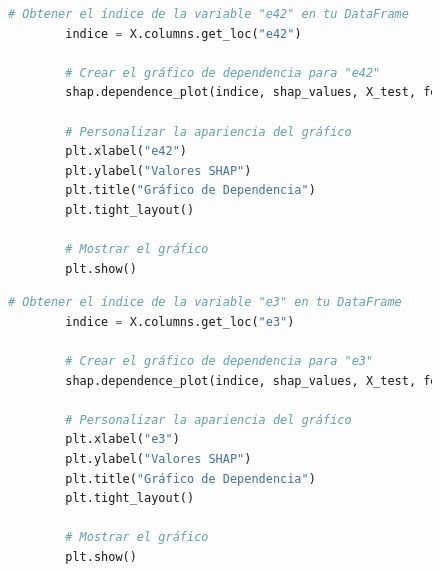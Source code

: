 \begin{figure}[H]
    \centering
    \begin{minipage}{0.48\textwidth}
        \begin{lstlisting}[language=Python, caption=Grafico de dependencia e42, label=lst:grafDepe42]
        # Obtener el índice de la variable "e42" en tu DataFrame
        indice = X.columns.get_loc("e42")
        
        # Crear el gráfico de dependencia para "e42"
        shap.dependence_plot(indice, shap_values, X_test, feature_names=X.columns, show=False)
        
        # Personalizar la apariencia del gráfico
        plt.xlabel("e42")
        plt.ylabel("Valores SHAP")
        plt.title("Gráfico de Dependencia")
        plt.tight_layout()
        
        # Mostrar el gráfico
        plt.show()
        \end{lstlisting}
    \end{minipage}
    \hfill
    \begin{minipage}{0.48\textwidth}
        \begin{lstlisting}[language=Python, caption=Grafico de dependencia e3, label=lst:grafDepe3]
        # Obtener el índice de la variable "e3" en tu DataFrame
        indice = X.columns.get_loc("e3")
        
        # Crear el gráfico de dependencia para "e3"
        shap.dependence_plot(indice, shap_values, X_test, feature_names=X.columns, show=False)
        
        # Personalizar la apariencia del gráfico
        plt.xlabel("e3")
        plt.ylabel("Valores SHAP")
        plt.title("Gráfico de Dependencia")
        plt.tight_layout()
        
        # Mostrar el gráfico
        plt.show()
        \end{lstlisting}
    \end{minipage}
\end{figure}

